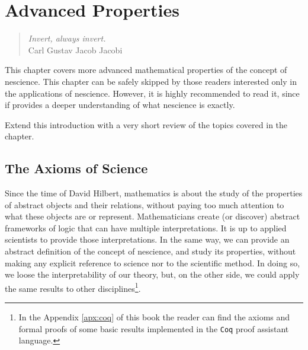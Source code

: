 %
%


\chapter{Advanced Properties}
\label{chap:Properties-Nescience}

\begin{quote}
\begin{flushright}
\emph{Invert, always invert.}\\
Carl Gustav Jacob Jacobi\\
\end{flushright}
\end{quote}
\bigskip

This chapter covers more advanced mathematical properties of the concept of nescience. This chapter can be safely skipped by those readers interested only in the applications of nescience. However, it is highly recommended to read it, since if provides a deeper understanding of what nescience is exactly.

{\color{red} Extend this introduction with a very short review of the topics covered in the chapter.}

%
%

\section{The Axioms of Science}

Since the time of David Hilbert, mathematics is about the study of the properties of abstract objects and their relations, without paying too much attention to what these objects are or represent. Mathematicians create (or discover) abstract frameworks of logic that can have multiple interpretations. It is up to applied scientists to provide those interpretations. In the same way, we can provide an abstract definition of the concept of nescience, and study its properties, without making any explicit reference to science nor to the scientific method. In doing so, we loose the interpretability of our theory, but, on the other side, we could apply the same results to other disciplines\footnote{In the Appendix \ref{apx:coq} of this book the reader can find the axioms and formal proofs of some basic results implemented in the \texttt{Coq} proof assistant language.}.

